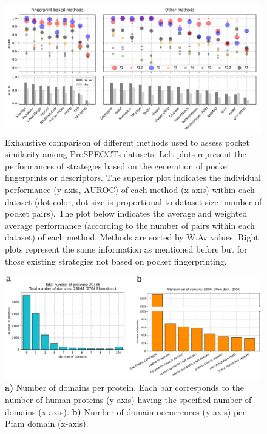 \begin{figure}[htbp]
  \centering
  \includegraphics[width=0.9\linewidth]{figures/PocketVec/Supplementary/FigS14.png}
  \caption{
  Exhaustive comparison of different methods used to assess pocket similarity among ProSPECCTs datasets. Left plots represent the performances of strategies based on the generation of pocket fingerprints or descriptors. The superior plot indicates the individual performance (y-axis, AUROC) of each method (x-axis) within each dataset (dot color, dot size is proportional to dataset size -number of pocket pairs). The plot below indicates the average and weighted average performance (according to the number of pairs within each dataset) of each method. Methods are sorted by W.Av values. Right plots represent the same information as mentioned before but for those existing strategies not based on pocket fingerprinting.  
  }
  \label{PocketVec_FigS14}
\end{figure}

\begin{figure}[htbp]
  \centering
  \includegraphics[width=\linewidth]{figures/PocketVec/Supplementary/FigS15.png} 
  \caption{
    \textbf{a)} Number of domains per protein. Each bar corresponds to the number of human proteins (y-axis) having the specified number of domains (x-axis).
    \textbf{b)} Number of domain occurrences (y-axis) per Pfam domain (x-axis).
  }
  \label{PocketVec_FigS15}
\end{figure}



